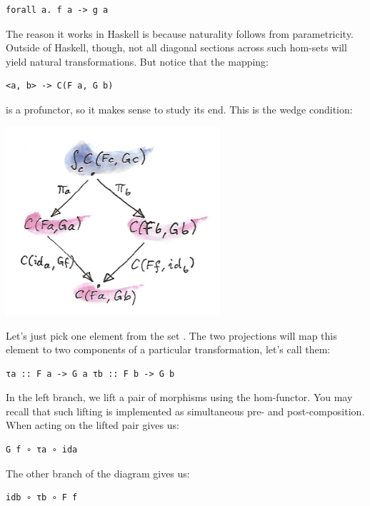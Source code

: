 \begin{verbatim}
forall a. f a -> g a
\end{verbatim}

The reason it works in Haskell is because naturality follows from
parametricity. Outside of Haskell, though, not all diagonal sections
across such hom-sets will yield natural transformations. But notice that
the mapping:

\begin{verbatim}
<a, b> -> C(F a, G b)
\end{verbatim}

is a profunctor, so it makes sense to study its end. This is the wedge
condition:

\includegraphics[width=3.12500in]{images/end1.jpg}

Let's just pick one element from the set .
The two projections will map this element to two components of a
particular transformation, let's call them:

\begin{verbatim}
τa :: F a -> G a τb :: F b -> G b
\end{verbatim}

In the left branch, we lift a pair of morphisms
 using the hom-functor. You
may recall that such lifting is implemented as simultaneous pre- and
post-composition. When acting on  the lifted pair gives us:

\begin{verbatim}
G f ∘ τa ∘ ida
\end{verbatim}

The other branch of the diagram gives us:

\begin{verbatim}
idb ∘ τb ∘ F f
\end{verbatim}

